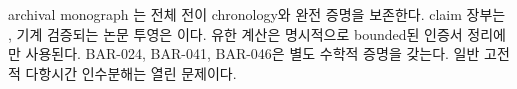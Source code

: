 \documentclass[11pt]{article}
\begin{document}
archival monograph \archivepaper{}는 전체 전이 chronology와 완전 증명을
보존한다. claim 장부는 , 기계 검증되는 논문
투영은 이다. 유한 계산은
명시적으로 bounded된 인증서 정리에만 사용된다. BAR-024, BAR-041,
BAR-046은 별도 수학적 증명을 갖는다. 일반 고전적 다항시간 인수분해는
열린 문제이다.


\small

\end{document}
